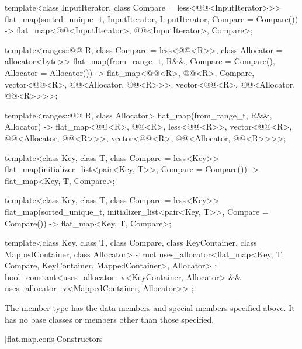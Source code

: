 \begin{codeblock}
{  template<class InputIterator, class Compare = less<@@<InputIterator>>>
    flat_map(sorted_unique_t, InputIterator, InputIterator, Compare = Compare())
      -> flat_map<@@<InputIterator>, @@<InputIterator>, Compare>;

  template<ranges::@@ R, class Compare = less<@@<R>>,
           class Allocator = allocator<byte>>
    flat_map(from_range_t, R&&, Compare = Compare(), Allocator = Allocator())
      -> flat_map<@@<R>, @@<R>, Compare,
                  vector<@@<R>, @@<Allocator, @@<R>>>,
                  vector<@@<R>, @@<Allocator, @@<R>>>>;

  template<ranges::@@ R, class Allocator>
    flat_map(from_range_t, R&&, Allocator)
      -> flat_map<@@<R>, @@<R>, less<@@<R>>,
                  vector<@@<R>, @@<Allocator, @@<R>>>,
                  vector<@@<R>, @@<Allocator, @@<R>>>>;

  template<class Key, class T, class Compare = less<Key>>
    flat_map(initializer_list<pair<Key, T>>, Compare = Compare())
      -> flat_map<Key, T, Compare>;

  template<class Key, class T, class Compare = less<Key>>
    flat_map(sorted_unique_t, initializer_list<pair<Key, T>>, Compare = Compare())
      -> flat_map<Key, T, Compare>;

  template<class Key, class T, class Compare, class KeyContainer, class MappedContainer,
           class Allocator>
    struct uses_allocator<flat_map<Key, T, Compare, KeyContainer, MappedContainer>, Allocator>
      : bool_constant<uses_allocator_v<KeyContainer, Allocator> &&
                      uses_allocator_v<MappedContainer, Allocator>> { };
}
\end{codeblock}

\pnum
The member type  has the data members and special members
specified above.
It has no base classes or members other than those specified.

[flat.map.cons]{Constructors}

